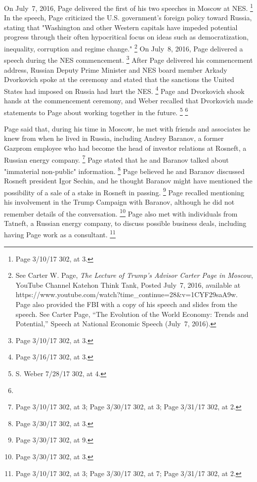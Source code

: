 On July~7, 2016, Page delivered the first of his two speeches in Moscow at NES.%
\footnote{Page 3/10/17 302, at 3.}
In the speech, Page criticized the U.S. government's foreign policy toward Russia, stating that "Washington and other Western capitals have impeded potential progress through their often hypocritical focus on ideas such as democratization, inequality, corruption and regime change."%
\footnote{See Carter W. Page, \textit{The Lecture of Trump's Advisor Carter Page in Moscow}, YouTube Channel Katehon Think Tank, Posted July~7, 2016,
available at https://www.youtube.com/watch?time\_continue=28\&v=1CYF29saA9w.
Page also provided the FBI with a copy of his speech and slides from the speech.
See Carter Page, “The Evolution of the World Economy: Trends and Potential,” Speech at National Economic Speech (July~7, 2016).} %
On July~8, 2016, Page delivered a speech during the NES commencement.%
\footnote{Page 3/10/17 302, at 3.}
After Page delivered his commencement address, Russian Deputy Prime Minister and NES board member Arkady Dvorkovich spoke at the ceremony and stated that the sanctions the United States had imposed on Russia had hurt the NES\null.%
\footnote{Page 3/16/17 302, at 3.}
Page and Dvorkovich shook hands at the commencement ceremony, and Weber recalled that Dvorkovich made statements to Page about working together in the future.%
\footnote{S. Weber 7/28/17 302, at 4.}
\footnote{}

Page said that, during his time in Moscow, he met with friends and associates he knew from when he lived in Russia, including Andrey Baranov, a former Gazprom employee who had become the head of investor relations at Rosneft, a Russian energy company.%
\footnote{Page 3/10/17 302, at 3;
Page 3/30/17 302, at 3;
Page 3/31/17 302, at 2.}
Page stated that he and Baranov talked about "immaterial non-public" information.%
\footnote{Page 3/30/17 302, at 3.}
Page believed he and Baranov discussed Rosneft president Igor Sechin, and he thought Baranov might have mentioned the possibility of a sale of a stake in Rosneft in passing.%
\footnote{Page 3/30/17 302, at 9. }
Page recalled mentioning his involvement in the Trump Campaign with Baranov, although he did not remember details of the conversation.%
\footnote{ Page 3/30/17 302, at 3.}
Page also met with individuals from Tatneft, a Russian energy company, to discuss possible business deals, including having Page work as a consultant.%
\footnote{Page 3/10/17 302, at 3;
Page 3/30/17 302, at 7;
Page 3/31/17 302, at 2.}

